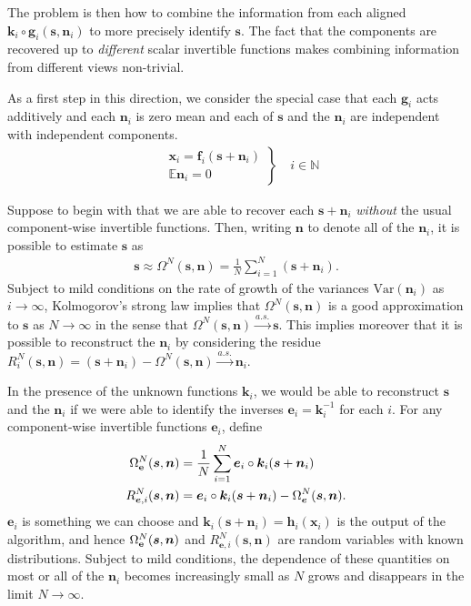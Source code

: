 \documentclass[letterpaper]{article}
\theoremstyle{definition}
\begin{document}
The problem is then how to combine the information from each aligned $\bm{k}_i \circ \bm{g}_i(\bm{s},\bm{n}_i)$ to more precisely identify $\bm{s}$.
The fact that the components are recovered up to \emph{different} scalar invertible functions makes combining information from different views non-trivial.


As a first step in this direction, we consider the special case that each $\bm{g}_i$ acts additively and each $\bm{n}_i$ is zero mean and each of $\bm{s}$ and the $\bm{n}_i$ are independent with independent components.
\begin{align}
\left.
   \begin{array}{ll}
&\bm{x}_{i}=\bm{f}_{i}(\bm{s} + \bm{n}_{i}) \\
&\mathbb{E}\bm{n}_i= 0
   \end{array}
   \right\rbrace \quad i \in \mathbb{N}
\end{align}

Suppose to begin with that we are able to recover each $\bm{s} + \bm{n}_i$ \emph{without} the usual component-wise invertible functions. Then, writing $\bm{n}$ to denote all of the $\bm{n}_i$, it is possible to estimate $\bm{s}$ as
\begin{align*}
    \bm{s} \approx \Omega^N(\bm{s}, \bm{n}) = \frac{1}{N}\sum_{i=1}^N \left(\bm{s} + \bm{n}_i\right).
\end{align*}
Subject to mild conditions on the rate of growth of the variances $\text{Var}(\bm{n}_i)$ as $i\to\infty$, Kolmogorov's strong law implies that $\Omega^N(\bm{s}, \bm{n})$ is a good approximation to $\bm{s}$ as $N\to\infty$ in the sense that  $\Omega^N(\bm{s}, \bm{n}) \overset{a.s.}{\longrightarrow} \bm{s}$.
This implies moreover that it is possible to reconstruct the $\bm{n}_i$ by considering the residue $R^N_i(\bm{s}, \bm{n}) = (\bm{s} + \bm{n}_i) - \Omega^N(\bm{s}, \bm{n}) \overset{a.s.}{\longrightarrow} \bm{n}_i$.

In the presence of the unknown functions $\bm{k}_i$, we would be able to reconstruct $\bm{s}$ and the $\bm{n}_i$ if we were able to identify the inverses $\bm{e}_i = \bm{k}_i^{-1}$ for each $i$.
For any component-wise invertible functions $\bm{e}_i$, define
\begin{align*}
    \Omega_{\mathbf{e}}^N(\bm{s}, \bm{n}) &= \frac{1}{N} \sum_{i=1}^N \bm{e}_i\circ \bm{k}_i( \bm{s} + \bm{n}_i) \\
    R_{\bm{e}, i}^N(\bm{s}, \bm{n}) &= \bm{e}_i\circ \bm{k}_i( \bm{s} + \bm{n}_i) - \Omega_{\bm{e}}^N(\bm{s}, \bm{n}).\\
\end{align*}
$\bm{e}_i$ is something we can choose and $\bm{k}_i(\bm{s}+\bm{n}_i) = \bm{h}_i(\bm{x}_i)$ is the output of the algorithm, and hence $\Omega_{\mathbf{e}}^N(\bm{s}, \bm{n})$ and $R_{\bm{e}, i}^N(\bm{s}, \bm{n})$ are random variables with known distributions.
Subject to mild conditions, the dependence of these quantities on most or all of the $\bm{n}_i$ becomes increasingly small as $N$ grows and disappears in the limit $N\to\infty$.
\end{document}
